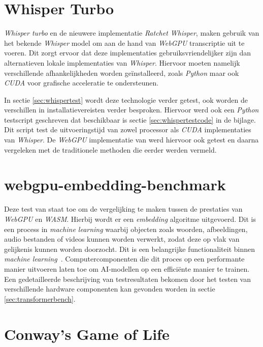 \section{Whisper Turbo}

\textit{Whisper turbo} en de nieuwere implementatie \textit{Ratchet Whisper}, maken gebruik van het bekende \textit{Whisper} model om aan de hand van \textit{WebGPU} transcriptie uit te voeren. Dit zorgt ervoor dat deze implementaties  gebruiksvriendelijker zijn dan alternatieven lokale implementaties van \textit{Whisper}. Hiervoor moeten namelijk verschillende afhankelijkheden worden geïnstalleerd, zoals \textit{Python} maar ook \textit{CUDA} voor grafische acceleratie te ondersteunen. 

\bigbreak{}

In sectie \ref{sec:whispertest} wordt deze technologie verder getest, ook worden de verschillen in installatievereisten verder besproken. Hiervoor werd ook een \textit{Python} testscript geschreven dat beschikbaar is sectie \ref{sec:whispertestcode} in de bijlage. Dit script test de uitvoeringstijd van zowel processor als \textit{CUDA} implementaties van \textit{Whisper}. De \textit{WebGPU} implementatie van \textcite{Fleetwood2024} werd hiervoor ook getest en daarna vergeleken met de traditionele methoden die eerder werden vermeld.

\section{webgpu-embedding-benchmark}

Deze test van \textcite{Lochner2024} staat toe om de vergelijking te maken tussen de prestaties van \textit{WebGPU} en \textit{WASM}. Hierbij wordt er een \textit{embedding} algoritme uitgevoerd. Dit is een process in \textit{machine learning} waarbij objecten zoals woorden, afbeeldingen, audio bestanden of videos kunnen worden verwerkt, zodat deze op vlak van gelijkenis kunnen worden doorzocht. Dit is een belangrijke functionaliteit binnen \textit{machine learning}~\autocite{Cloudflare2024}. Computercomponenten die dit proces op een performante manier uitvoeren laten toe om AI-modellen op een efficiënte manier te trainen. Een gedetailleerde beschrijving van testresultaten bekomen door het testen van verschillende hardware componenten kan gevonden worden in sectie \ref{sec:transformerbench}.

\section{Conway's Game of Life}

